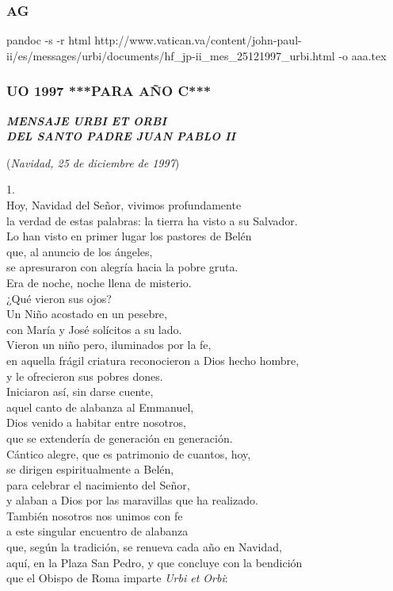 \subsubsection{AG } pandoc -s -r html http://www.vatican.va/content/john-paul-ii/es/messages/urbi/documents/hf_jp-ii_mes_25121997_urbi.html -o aaa.tex

\subsubsection{UO 1997 ***PARA AÑO C*** } \emph{\textbf{MENSAJE URBI ET ORBI\\ DEL SANTO PADRE JUAN PABLO II}}

(\emph{Navidad, 25 de diciembre de 1997})

 

1. \\ Hoy, Navidad del Señor, vivimos profundamente\\ la verdad de estas palabras: la tierra ha visto a su Salvador.\\ Lo han visto en primer lugar los pastores de Belén\\ que, al anuncio de los ángeles,\\ se apresuraron con alegría hacia la pobre gruta.\\ Era de noche, noche llena de misterio.\\ ¿Qué vieron sus ojos?\\ Un Niño acostado en un pesebre,\\ con María y José solícitos a su lado.\\ Vieron un niño pero, iluminados por la fe,\\ en aquella frágil criatura reconocieron a Dios hecho hombre,\\ y le ofrecieron sus pobres dones.\\ Iniciaron así, sin darse cuente,\\ aquel canto de alabanza al Emmanuel,\\ Dios venido a habitar entre nosotros,\\ que se extendería de generación en generación.\\ Cántico alegre, que es patrimonio de cuantos, hoy,\\ se dirigen espiritualmente a Belén,\\ para celebrar el nacimiento del Señor,\\ y alaban a Dios por las maravillas que ha realizado.\\ También nosotros nos unimos con fe\\ a este singular encuentro de alabanza\\ que, según la tradición, se renueva cada año en Navidad,\\ aquí, en la Plaza San Pedro, y que concluye con la bendición\\ que el Obispo de Roma imparte \emph{Urbi et Orbi}:

